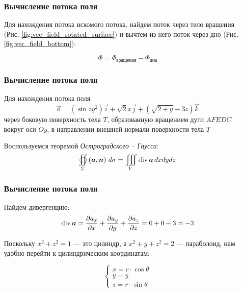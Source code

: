 \begin{frame}\frametitle{Вычисление потока поля}
	Для нахождения потока искомого потока, найдем поток через тело вращения (Рис. \ref{fig:vec_field_rotated_surface}) и вычтем из него поток через дно (Рис. \ref{fig:vec_field_bottom}):

	\begin{equation*}
		\Phi = \Phi_{\text{вращения}} - \Phi_{\text{дна}}
	\end{equation*}


\end{frame}

\begin{frame}\frametitle{Вычисление потока поля}
	Для нахождения потока поля
	\begin{equation*}
		\vec a = (\sin zy^2) \vec i + \sqrt{2} x \vec j + (\sqrt{2+y} -3z) \vec k
	\end{equation*}
	через боковую поверхность тела \(T\), образованную вращением дуги \(AFEDC\)
	вокруг оси \(Oy\), в направлении внешней нормали поверхности тела \(T\)

	Воспользуемся теоремой \textit{Остроградского -- Гаусса}:
	\begin{equation*}
		\oiint\limits_{\Sigma}\left( \vec {a}, \vec {n} \right) \, d\sigma = \iiint\limits_V \Div \vec {a} \, dxdydz
	\end{equation*}
\end{frame}

\begin{frame}\frametitle{Вычисление потока поля}
	Найдем дивергенцию:
	\begin{equation*}
		\Div \vec a = \frac{\partial a_x}{\partial x} +  \frac{\partial a_y}{\partial y} +  \frac{\partial a_z}{\partial z} = 0 + 0 - 3 = -3
	\end{equation*}

	Поскольку $x^2 + z^2 = 1$ — это цилиндр, а $x^2 + y + z^2 = 2$ — параболоид, нам удобно перейти к цилиндрическим координатам:

	\begin{equation*}
		\begin{cases}
			x = r \cdot \cos \theta \\
			y = y                   \\
			z = r \cdot \sin \theta
		\end{cases}
	\end{equation*}

\end{frame}

